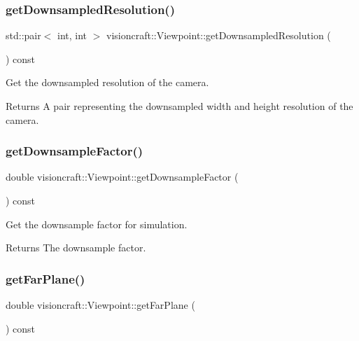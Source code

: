 \subsubsection{\texorpdfstring{get\+Downsampled\+Resolution()}{getDownsampledResolution()}}
{\footnotesize\ttfamily std\+::pair$<$ int, int $>$ visioncraft\+::\+Viewpoint\+::get\+Downsampled\+Resolution (\begin{DoxyParamCaption}{ }\end{DoxyParamCaption}) const}



Get the downsampled resolution of the camera. 

\begin{DoxyReturn}{Returns}
A pair representing the downsampled width and height resolution of the camera. 
\end{DoxyReturn}
\mbox{\label{classvisioncraft_1_1Viewpoint_a238c7a9deef702d7b8660bb53ba4f08f}} 
\subsubsection{\texorpdfstring{get\+Downsample\+Factor()}{getDownsampleFactor()}}
{\footnotesize\ttfamily double visioncraft\+::\+Viewpoint\+::get\+Downsample\+Factor (\begin{DoxyParamCaption}{ }\end{DoxyParamCaption}) const}



Get the downsample factor for simulation. 

\begin{DoxyReturn}{Returns}
The downsample factor. 
\end{DoxyReturn}
\mbox{\label{classvisioncraft_1_1Viewpoint_a3ec5fe63ec14414aa864cd53518215ea}} 
\subsubsection{\texorpdfstring{get\+Far\+Plane()}{getFarPlane()}}
{\footnotesize\ttfamily double visioncraft\+::\+Viewpoint\+::get\+Far\+Plane (\begin{DoxyParamCaption}{ }\end{DoxyParamCaption}) const}



